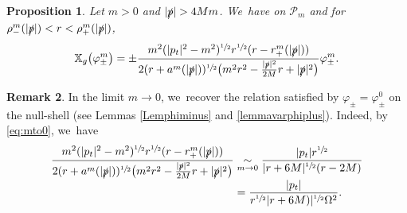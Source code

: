 \documentclass[JEP,XML,SOM,Unicode,published]{cedram}
\theoremstyle{plain}
\newtheorem{proposition}{Proposition}[section]
\theoremstyle{definition}
\newtheorem{remark}[proposition]{Remark}
\newcommand{\isEquivTo}[1]{\underset{#1}{\sim}}
\newcommand\T{{\mathbb{X}}}
\begin{document}
\begin{proposition}\label{Provarphicotang}
Let $m > 0$ and $|\slashed{p}| > 4Mm$. We~have on $\mathcal{P}_m$ and for $\rho_{-}^{m}(|\slashed{p}|) < r < \rho_{+}^{m}(|\slashed{p}|)$,\vspace*{-5pt}
\begin{equation*}
\T_g \bigl(\varphi_\pm^m \bigr)=\pm \frac{m^2(|p_t|^2-m^2)^{\sfrac{1}{2}}r^{\sfrac{1}{2}}(r-r^{m}_+(|\slashed{p}|))}{2(r+a^{m}(|\slashed{p}|))^{\sfrac{1}{2}}\bigl(m^2 r^2-\frac{|\slashed{p}|^2}{2M}r+|\slashed{p}|^2\bigr)}\varphi_{\pm}^m.
\end{equation*}
\end{proposition}
\begin{remark}\label{Rklimitmto0}
In the limit $m \to 0$, we~recover the relation satisfied by $\varphi_\pm = \varphi^0_\pm$ on the null-shell (see Lemmas \ref{Lemphiminus} and \ref{lemmavarphiplus}). Indeed, by \eqref{eq:mto0}, we~have\vspace*{-3pt}
\begin{align*}
\frac{m^2(|p_t|^2-m^2)^{\sfrac{1}{2}}r^{\sfrac{1}{2}}(r-r^{m}_+(|\slashed{p}|))}{2(r+a^{m}(|\slashed{p}|))^{\sfrac{1}{2}}\bigl(m^2 r^2-\frac{|\slashed{p}|^2}{2M}r+|\slashed{p}|^2\bigr)}
&\isEquivTo{m \to 0}\frac{|p_t|r^{\sfrac{1}{2}}}{|r+6M|^{\sfrac{1}{2}}(r-2M)}
\\[-3pt]
&=\frac{|p_t|}{r^{\sfrac{1}{2}}|r+6M)|^{\sfrac{1}{2}} \Omega^2}.
\end{align*}
\end{remark}
\end{document}
